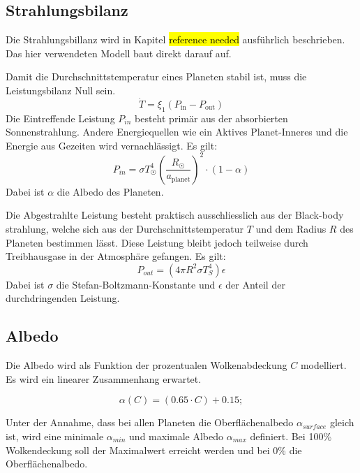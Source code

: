 \begin{refsection}
\subsection{Strahlungsbilanz}
Die Strahlungsbillanz wird in Kapitel \hl{reference needed} ausführlich beschrieben. Das hier verwendeten Modell baut direkt darauf auf.

Damit die Durchschnittstemperatur eines Planeten stabil ist, muss die Leistungsbilanz Null sein.
\begin{equation}
\dot{T} = \xi_1(P_{\text{in}} - P_{\text{out}})
\end{equation}
Die Eintreffende Leistung $P_{in}$ besteht primär aus der absorbierten Sonnenstrahlung. Andere Energiequellen wie ein Aktives Planet-Inneres und die Energie aus Gezeiten wird vernachlässigt. Es gilt:
\begin{equation}
P_{in} = \sigma T_{\astrosun}^4 \left( \frac{R_{\astrosun}}{a_{\text{planet}}} \right) ^2 \cdot (1-\alpha)
\end{equation}
Dabei ist $\alpha$ die Albedo des Planeten.

Die Abgestrahlte Leistung besteht praktisch ausschliesslich aus der Black-body strahlung, welche sich aus der Durchschnittstemperatur $T$ und dem Radius $R$ des Planeten bestimmen lässt. Diese Leistung bleibt jedoch teilweise durch Treibhausgase in der Atmosphäre gefangen. Es gilt: 
\begin{equation}
P_{out} = (4 \pi R^2 \sigma T_{S}^4)\epsilon
\end{equation}
Dabei ist $\sigma$ die Stefan-Boltzmann-Konstante und $\epsilon$ der Anteil der durchdringenden Leistung.

\subsection{Albedo}

Die Albedo wird als Funktion der prozentualen Wolkenabdeckung $C$ modelliert. Es wird ein linearer Zusammenhang erwartet.

\begin{equation}
\alpha(C) = (0.65 \cdot C) + 0.15;
\end{equation}


Unter der Annahme, dass bei allen Planeten die Oberflächenalbedo $\alpha_{surface}$ gleich ist, wird eine minimale $\alpha_{min}$ und maximale Albedo $\alpha_{max}$ definiert. Bei 100\% Wolkendeckung soll der Maximalwert erreicht werden und bei 0\% die Oberflächenalbedo.


\end{refsection}
